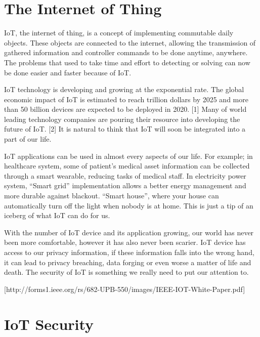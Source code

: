 \section{The Internet of Thing}

IoT, the internet of thing, is a concept of implementing commutable daily objects. These objects are connected to the internet, allowing the transmission of gathered information and controller commands to be done anytime, anywhere. The problems that used to take time and effort to detecting or solving can now be done easier and faster because of IoT.  

IoT technology is developing and growing at the exponential rate. The global economic impact of IoT is estimated to reach trillion dollars by 2025 and more than 50 billion devices are expected to be deployed in 2020. [1] Many of world leading technology companies are pouring their resource into developing the future of IoT. [2] It is natural to think that IoT will soon be integrated into a part of our life.  
  
IoT applications can be used in almost every aspects of our life. For example; in healthcare system, some of patient’s medical asset information can be collected through a smart wearable, reducing tasks of medical staff. In electricity power system, “Smart grid” implementation allows a better energy management and more durable against blackout. “Smart house”, where your house can automatically turn off the light when nobody is at home. This is just a tip of an iceberg of what IoT can do for us. 

With the number of IoT device and its application growing, our world has never been more comfortable, however it has also never been scarier. IoT device has access to our privacy information, if these information falls into the wrong hand, it can lead to privacy breaching, data forging or even worse a matter of life and death. The security of IoT is something we really need to put our attention to. 

[http://forms1.ieee.org/rs/682-UPB-550/images/IEEE-IOT-White-Paper.pdf] 

\section{IoT Security}
 
